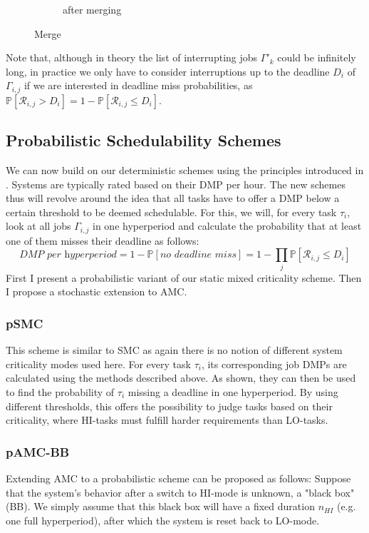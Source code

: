 \documentclass[a4paper,oneside]{csthesis}
\begin{document}
\begin{enumerate}
\begin{figure}[h]
\begin{subfigure}[c]{0.3\textwidth}
            \caption{after merging}
        \end{subfigure}
        \caption{Merge}
    \end{figure}
\end{enumerate}

Note that, although in theory the list of interrupting jobs $\Gamma'_k$ could be infinitely long, in practice we only have to consider interruptions up to the deadline $D_i$ of $\Gamma_{i,j}$ if we are interested in deadline miss probabilities, as $\mathbb{P}[\mathcal{R}_{i,j} > D_i] = 1 - \mathbb{P}[\mathcal{R}_{i,j} \leq D_i]$.

\subsection{Probabilistic Schedulability Schemes}
\label{subsec:prob-schemes}
We can now build on our deterministic schemes using the principles introduced in . Systems are typically rated based on their DMP per hour. The new schemes thus will revolve around the idea that all tasks have to offer a DMP below a certain threshold to be deemed schedulable. For this, we will, for every task $\tau_i$, look at all jobs $\Gamma_{i,j}$ in one hyperperiod and calculate the probability that at least one of them misses their deadline as follows:
\begin{equation*}
    \textit{DMP per hyperperiod} = 1 - \mathbb{P}[\textit{no deadline miss}] = 1 - \prod_j \mathbb{P}[\mathcal{R}_{i,j} \leq D_i]
\end{equation*}
First I present a probabilistic variant of our static mixed criticality scheme. Then I propose a stochastic extension to AMC.
\subsubsection{pSMC}
This scheme is similar to SMC as again there is no notion of different system criticality modes used here. For every task $\tau_i$, its corresponding job DMPs are calculated using the methods described above. As shown, they can then be used to find the probability of $\tau_i$ missing a deadline in one hyperperiod. By using different thresholds, this offers the possibility to judge tasks based on their criticality, where HI-tasks must fulfill harder requirements than LO-tasks.
\subsubsection{pAMC-BB}
Extending AMC to a probabilistic scheme can be proposed as follows: Suppose that the system's behavior after a switch to HI-mode is unknown, a "black box" (BB). We simply assume that this black box will have a fixed duration $n_{HI}$ (e.g. one full hyperperiod), after which the system is reset back to LO-mode.
\end{document}

